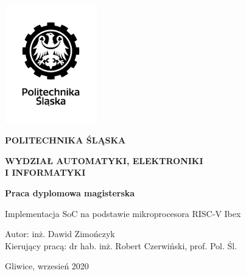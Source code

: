 \documentclass[11pt,a4paper]{article}
\begin{document}
	\date{}
\begin{center}
	\centering

\includegraphics[width=4cm]{./rysunki/logo.jpg}
\\
\vspace{1.5cm}
 
\textbf{\Large POLITECHNIKA ŚLĄSKA}
\\
\vspace{0.5cm}
 
\textbf{\Large WYDZIAŁ AUTOMATYKI, ELEKTRONIKI}
\\
\vspace{0.1cm}
\textbf{\Large I INFORMATYKI}
\\
\vspace{0.5cm}


\vspace{3cm}
 
\textbf{\LARGE  Praca dyplomowa magisterska}
\\
\vspace{2cm}

\Large Implementacja SoC na podstawie mikroprocesora RISC-V Ibex
\vspace{3cm}

\begin{flushleft}
	
\Large Autor: inż. Dawid Zimończyk
\\
\Large Kierujący pracą: dr hab. inż. Robert Czerwiński, prof. Pol. Śl.
\\

\end{flushleft}
 \vspace{2.5cm}
\Large Gliwice, wrzesień 2020


\end{center}
\thispagestyle{empty}



\thispagestyle{empty}
\setcounter{page}{2}

\newpage
\end{document}
